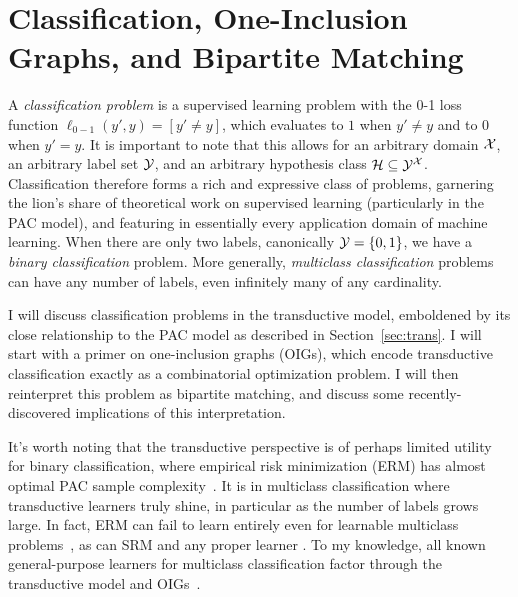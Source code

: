 \section{Classification, One-Inclusion Graphs, and Bipartite Matching}
\label{sec:class}

A \emph{classification problem} is a supervised learning problem with the 0-1 loss function $\ell_{0-1}(y',y)=[y' \neq y]$, which evaluates to $1$ when $y' \neq y$ and to $0$ when $y'=y$. It is important to note that this allows for an arbitrary domain $\mathcal{X}$, an arbitrary label set $\mathcal{Y}$, and an arbitrary hypothesis class $\mathcal{H} \subseteq \mathcal{Y}^{\mathcal{X}}$.  Classification therefore forms a rich and expressive class of problems,  garnering the lion's share of theoretical work on supervised learning (particularly in the PAC model), and featuring in essentially every application domain of machine learning. %
%
When there are only two labels, canonically $\mathcal{Y}= \left\{ 0,1 \right\}$, we have a \emph{binary classification} problem.  More generally, \emph{multiclass classification} problems can have any number of labels, even infinitely many of any cardinality.

I will discuss classification problems in the transductive model, emboldened by its close relationship to the PAC model as described in Section~\ref{sec:trans}. I will start with a primer on one-inclusion graphs (OIGs), which encode transductive classification exactly  as a combinatorial optimization problem. I will then reinterpret this problem as bipartite matching, and discuss some recently-discovered implications of this interpretation.

It's worth noting that the transductive perspective is of perhaps limited utility for binary classification, where empirical risk minimization (ERM) has almost optimal PAC sample complexity~\cite{shalev-shwartz_understanding_2014}. It is in multiclass classification where transductive learners truly shine, in particular as the number of labels grows large. In fact, ERM can fail to learn entirely even for learnable multiclass problems~\cite{daniely_multiclass_2011}, as can SRM and any proper learner \cite{daniely_optimal_2014}.  To my knowledge, all known general-purpose learners for multiclass classification factor through the transductive model and  OIGs~\cite{daniely_optimal_2014, brukhim_characterization_2022,aden-ali_optimal_2023,asilis_regularization_2024}.





